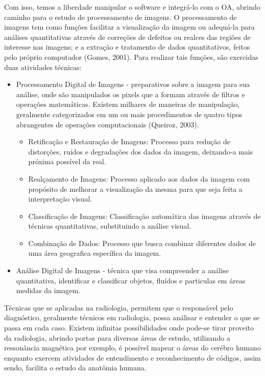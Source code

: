 \documentclass[12pt,openright,oneside,a4paper,english,french,spanish,brazil]{unifil}
\begin{document}
Com isso, temos a liberdade manipular o software e integrá-lo com o OA, abrindo caminho para o estudo de processamento de imagens. O processamento de imagens tem como funções facilitar a visualização da imagem ou adequá-la para análises quantitativas através de correções de defeitos ou realces das regiões de interesse nas imagens; e a extração e tratamento de dados quantitativos, feitos pelo próprio computador (Gomes, 2001). Para realizar tais funções, são exercidas duas atividades técnicas:
\begin{itemize}
\item Processamento Digital de Imagens - preparativos sobre a imagem para sua análise, onde são manipulados os pixels que a formam através de filtros e operações matemáticas. Existem milhares de maneiras de manipulação, geralmente categorizados em um ou mais procedimentos de quatro tipos abrangentes de operações computacionais (Queiroz, 2003).
\begin{itemize}
\item Retificação e Restauração de Imagens: Processo para redução de distorções, ruídos e degradações dos dados da imagem, deixando-a mais próxima possível da real.
\item Realçamento de Imagens: Processo aplicado aos dados da imagem com propósito de melhorar a visualização da mesma para que seja feita a interpretação visual.
\item Classificação de Imagens: Classificação automática das imagens através de técnicas quantitativas, substituindo a análise visual.
\item Combinação de Dados: Processo que busca combinar diferentes dados de uma área geografica específica da imagem.
\end{itemize}

\item Análise Digital de Imagens - técnica que visa compreender a análise quantitativa, identificar e classificar objetos, fluídos e particulas em áreas medidas da imagem. 
\end{itemize}
Técnicas que se aplicadas na radiologia, permitem que o responsável pelo diagnóstico, geralmente técnicos em radiologia, possa análisar e entender o que se passa em cada caso. Existem infinitas possibilidades onde pode-se tirar proveito da radiologia, abrindo portas para diversas áreas de estudo, utilizando a ressonância magnética por exemplo,  é possível mapear o áreas do cerébro humano enquanto exercem atividades de entendimento e reconhecimento de códigos, assim sendo, facilita o estudo da anatômia humana.
\end{document}
